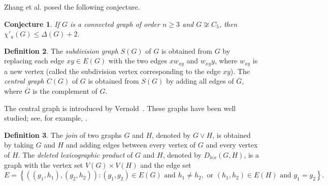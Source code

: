 \documentclass[12pt,reqno,a4paper]{amsart}
\theoremstyle{definition}
\newtheorem{defn}{Definition}[section]
\theoremstyle{plain}
\newtheorem{conjecture}[defn]{Conjecture}
\begin{document}
Zhang et al. \cite{ZLW2002} posed  the following conjecture.

\begin{conjecture}\label{Conjecture 1.4}
If $G$ is a connected graph of order $n\geq 3$ and
$G\not\cong C_5$, then $\chi'_{a}(G) \leq \Delta(G)+2$.
\end{conjecture}

\begin{defn}\label{Definition 1.5}
The \emph{subdivision graph} $S(G)$ of $G$ is obtained from $G$ by replacing each edge $xy\in E(G)$ with the two edges $xw_{xy}$ and $w_{xy}y$, where $w_{xy}$ is a new vertex (called the subdivision vertex corresponding to the edge $xy$).
The {\em central graph $C(G)$} of $G$ is obtained from $S(G)$ by adding all edges of $\overline{G}$, where $\overline{G}$ is the complement of $G$.
\end{defn}

The central graph is introduced by Vernold~\cite{Ver2007}. These graphs have been well studied; see, for example, \cite{AG2016, AM2022, BFKP2026, CSW2020, Eff2017, KK2021, KM2019, PVK2020, SM2017}.

\begin{defn}\label{Definition 1.6}
The {\em join} of two graphs $G$ and $H$, denoted by $G\vee H$, is obtained by taking $G$ and $H$ and adding
edges between every vertex of $G$ and every vertex of $H$.
The {\em deleted lexicographic product} of $G$ and $H$, 
denoted by $D_{lex}(G, H)$, is a graph with the vertex set 
$V(G) \times V(H)$ and the edge set 
$
E = \left\{ ((g_1, h_1), (g_2, h_2)) : (g_1, g_2) \in E(G) \text{ and } h_1 \neq h_2, 
\text{ or } (h_1, h_2) \in E(H) \text{ and } g_1 = g_2 \right\}.
$
\end{defn}
\end{document}
